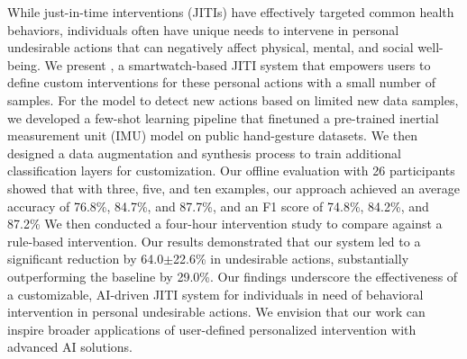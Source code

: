 While just-in-time interventions (JITIs) have effectively targeted common health behaviors, individuals often have unique needs to intervene in personal undesirable actions that can negatively affect physical, mental, and social well-being.
We present \projectname, a smartwatch-based JITI system that empowers users to define custom interventions for these personal actions with a small number of samples.
For the model to detect new actions based on limited new data samples, we developed a few-shot learning pipeline that finetuned a pre-trained inertial measurement unit (IMU) model on public hand-gesture datasets.
We then designed a data augmentation and synthesis process to train additional classification layers for customization.
Our offline evaluation with 26 participants showed that with three, five, and ten examples, our approach achieved an average accuracy of 76.8\%, 84.7\%, and 87.7\%, and an F1 score of 74.8\%, 84.2\%, and 87.2\%
We then conducted a four-hour intervention study to compare \projectname against a rule-based intervention. Our results demonstrated that our system led to a significant reduction by 64.0$\pm$22.6\% in undesirable actions, substantially outperforming the baseline by 29.0\%.
Our findings underscore the effectiveness of a customizable, AI-driven JITI system for individuals in need of behavioral intervention in personal undesirable actions.
We envision that our work can inspire broader applications of user-defined personalized intervention with advanced AI solutions.
